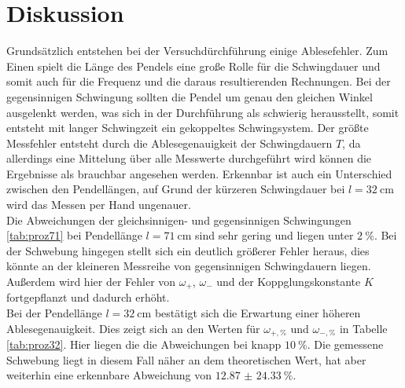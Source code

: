 \section{Diskussion}

Grundsätzlich entstehen bei der Versuchdürchführung einige Ablesefehler. Zum Einen spielt die Länge des Pendels eine große Rolle für die Schwingdauer und somit auch für die Frequenz und die daraus resultierenden Rechnungen. 
Bei der gegensinnigen Schwingung sollten die Pendel um genau den gleichen Winkel ausgelenkt werden, was sich in der Durchführung als schwierig herausstellt, somit entsteht mit langer Schwingzeit ein gekoppeltes Schwingsystem.
Der größte Messfehler entsteht durch die Ablesegenauigkeit der Schwingdauern $T$, da allerdings eine Mittelung über alle Messwerte durchgeführt wird können die Ergebnisse als brauchbar angesehen werden.
Erkennbar ist auch ein Unterschied zwischen den Pendellängen, auf Grund der kürzeren Schwingdauer bei $l = \SI{32}{\centi\meter}$ wird das Messen per Hand ungenauer.
\\
\newline
Die Abweichungen der gleichsinnigen- und gegensinnigen Schwingungen \ref{tab:proz71} bei Pendellänge $l = \SI{71}{\centi\meter}$ sind sehr gering und liegen unter $\SI{2}{\percent}$. Bei der Schwebung hingegen stellt sich ein deutlich größerer
Fehler heraus, dies könnte an der kleineren Messreihe von gegensinnigen Schwingdauern liegen. Außerdem wird hier der Fehler von $\omega_{+}$, $\omega_{-}$ und der Koppglungskonstante $K$ fortgepflanzt und dadurch erhöht.
\\
\newline
Bei der Pendellänge $l = \SI{32}{\centi\meter}$ bestätigt sich die Erwartung einer höheren Ablesegenauigkeit. Dies zeigt sich an den Werten für $\omega_{+{,}\si{\percent}}$ und $\omega_{-{,}\si{\percent}}$ in Tabelle \ref{tab:proz32}. Hier liegen
die die Abweichungen bei knapp $\SI{10}{\percent}$. Die gemessene Schwebung liegt in diesem Fall näher an dem theoretischen Wert, hat aber weiterhin eine erkennbare Abweichung von $\SI{12.87(2433)}{\percent}$.